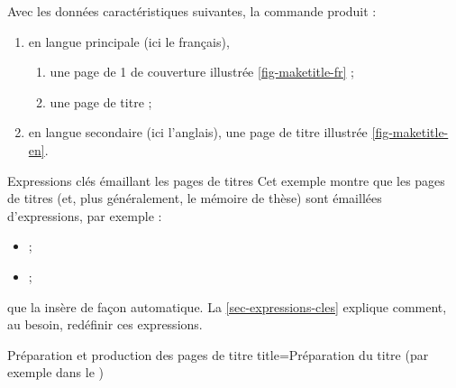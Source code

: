 Avec les données caractéristiques suivantes, la commande
 produit :
\begin{enumerate}
\item en langue principale (ici le français),
  \begin{enumerate}
  \item {}%
    une page de 1\iere{} de couverture illustrée
    \vref{fig-maketitle-fr} ;
  \item une page de titre ;
  \end{enumerate}
\item en langue secondaire (ici l'anglais), une page de titre illustrée
  \vref{fig-maketitle-en}.
\end{enumerate}
%
\begin{dbremark}{Expressions clés émaillant les pages de titres}{}
  Cet exemple montre que les pages de titres (et, plus généralement, le mémoire
  de thèse) sont émaillées d'expressions, par exemple :
  \begin{itemize}
  \item {} ;
  \item {} ;
  \end{itemize}
  que la \yatCl{} insère de façon automatique. La \vref{sec-expressions-cles}
  explique comment, au besoin, redéfinir ces expressions.
\end{dbremark}
%
\begin{dbexample}{Préparation et production des pages de titre}{}
%
  \NoAutoSpacing%
  {title=Préparation du titre (par exemple dans le \File{\characteristicsfile})}
\end{dbexample}

